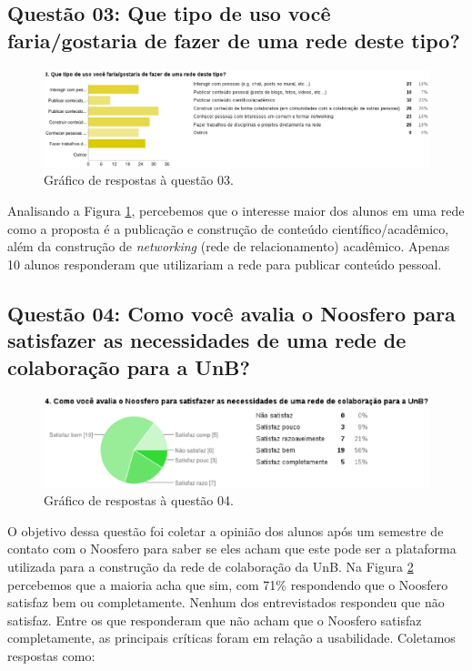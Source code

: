\subsection*{Questão 03: Que tipo de uso você faria/gostaria de fazer de uma
rede deste tipo?}

\begin{figure}[h!]
    \centering
    \includegraphics[keepaspectratio=true,scale=0.4]
      {figuras/p3.eps}
    \caption{Gráfico de respostas à questão 03.}
    \label{response:3}
\end{figure}

Analisando a Figura \ref{response:3}, percebemos que o interesse maior dos
alunos em uma rede como a proposta é a publicação e construção de conteúdo
científico/acadêmico, além da construção de \textit{networking} (rede de
relacionamento) acadêmico. Apenas 10 alunos responderam que utilizariam a rede
para publicar conteúdo pessoal.

\subsection*{Questão 04: Como você avalia o Noosfero para satisfazer as
necessidades de uma rede de colaboração para a UnB?}

\begin{figure}[h!]
    \centering
    \includegraphics[keepaspectratio=true,scale=0.55]
      {figuras/p4.eps}
    \caption{Gráfico de respostas à questão 04.}
    \label{response:4}
\end{figure}

O objetivo dessa questão foi coletar a opinião dos alunos após um semestre de
contato com o Noosfero para saber se eles acham que este pode ser a plataforma
utilizada para a construção da rede de colaboração da UnB. Na Figura
\ref{response:4} percebemos que a maioria acha que sim, com 71\% respondendo
que o Noosfero satisfaz bem ou completamente. Nenhum dos entrevistados
respondeu que não satisfaz.
%
Entre os que responderam que não acham que o Noosfero satisfaz completamente,
as principais críticas foram em relação a usabilidade. Coletamos respostas
como:

